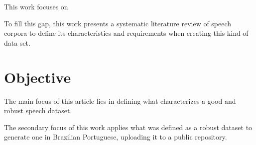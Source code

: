 This work focuses on 

To fill this gap, this work presents a systematic literature review of speech corpora to define its characteristics and requirements when creating this kind of data set.

\chapter{Objective}

The main focus of this article lies in defining what characterizes a good and robust speech dataset.

The secondary focus of this work applies what was defined as a robust dataset to generate one in Brazilian Portuguese, uploading it to a public repository. 
